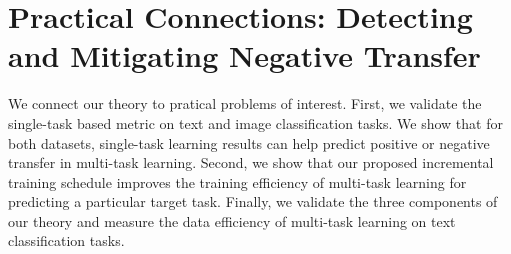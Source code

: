 \section{Practical Connections: Detecting and Mitigating Negative Transfer}

We connect our theory to pratical problems of interest.
First, we validate the single-task based metric on text and image classification tasks.
We show that for both datasets, single-task learning results can help predict positive or negative transfer in multi-task learning.
Second, we show that our proposed incremental training schedule improves the training efficiency of multi-task learning for predicting a particular target task.
Finally, we validate the three components of our theory and measure the data efficiency of multi-task learning on text classification tasks.

